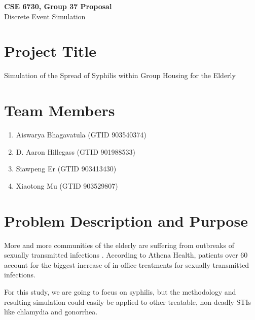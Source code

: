 \documentclass{article}
\begin{document}
	\begin{center}
    
		\LARGE{\textbf{CSE 6730, Group 37 Proposal}} \\
        \vspace{1em}
        \Large{Discrete Event Simulation} \\
     
	\end{center}
    \begin{normalsize}
    
    	\section{Project Title}
        
Simulation of the Spread of Syphilis within Group Housing for the Elderly
      
		\section{Team Members}
        
      \begin{enumerate}
      	\item Aiswarya Bhagavatula (GTID 903540374)
      	\item D. Aaron Hillegass (GTID 901988533)
      	\item Siawpeng Er (GTID 903413430)
      	\item Xiaotong Mu (GTID 903529807)
      \end{enumerate}
        
	   	\section{Problem Description and Purpose}
        
    More and more communities of the elderly are suffering from outbreaks of sexually transmitted infections \cite{mcdaniel_2017}. According to Athena Health, patients over 60 account for the biggest increase of in-office treatments for sexually transmitted infections.
    
    For this study, we are going to focus on syphilis, but the methodology and resulting simulation could easily be applied to other treatable, non-deadly STIs like chlamydia and gonorrhea.
    

\end{normalsize}
\end{document}
